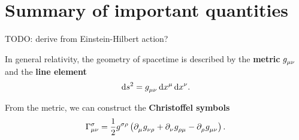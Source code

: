 \section{Summary of important quantities}
\label{chap:gr_summary} %

TODO: derive from Einstein-Hilbert action?

In general relativity, the geometry of spacetime is described by the \textbf{metric} $g\indices{_\mu_\nu}$ and the \textbf{line element}
\begin{equation}
	\dif s^2 = g\indices{_\mu_\nu} \dif x^\mu \dif x^\nu .
	\label{eq:def_line_elem}
\end{equation}

From the metric, we can construct the \textbf{Christoffel symbols}
\begin{equation}
	\Gamma^\sigma_{\mu \nu} = \frac{1}{2} g\indices{^\sigma^\rho} \left(
		\partial\indices{_\mu} g\indices{_\nu_\rho} +
		\partial\indices{_\nu} g\indices{_\rho_\mu} -
		\partial\indices{_\rho} g\indices{_\mu_\nu}
	\right) .
	\label{eq:def_christoffel}
\end{equation}

